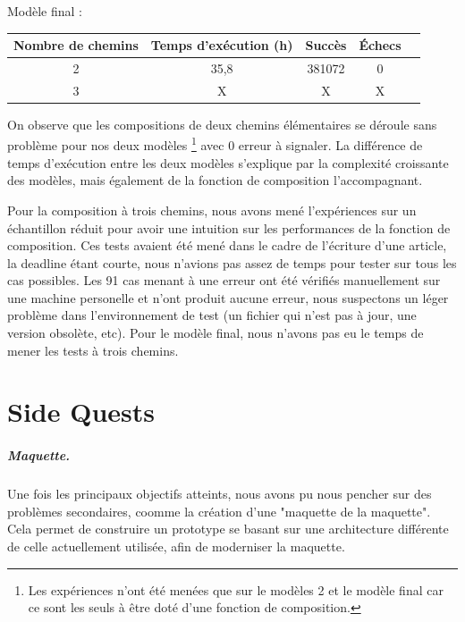 \documentclass[oneside, a4paper, 11pt]{book}
\begin{document}
\begin{center}
	Modèle final :
\begin{tabular}{|c|c|c|c|c|}
	\hline
	Nombre de chemins & Temps d'exécution (h) & Succès & Échecs\\
	\hline
	2 & 35,8 & 381072 & 0 \\
	\hline
	3 & X  & X & X \\
	\hline
\end{tabular}
\end{center}

On observe que les compositions de deux chemins élémentaires se déroule sans problème pour nos deux modèles \footnote{Les expériences n'ont été menées que sur le modèles 2 et le modèle final car ce sont les seuls à être doté d'une fonction de composition.} avec 0 erreur à signaler.
La différence de temps d'exécution entre les deux modèles s'explique par la complexité croissante des modèles, mais également de la fonction de composition l'accompagnant.

Pour la composition à trois chemins, nous avons mené l'expériences sur un échantillon réduit pour avoir une intuition sur les performances de la fonction de composition. Ces tests avaient été mené dans le cadre de l'écriture d'une article, la deadline étant courte, nous n'avions pas assez de temps pour tester sur tous les cas possibles.
Les 91 cas menant à une erreur ont été vérifiés manuellement sur une machine personelle et n'ont produit aucune erreur, nous suspectons un léger problème dans l'environnement de test (un fichier qui n'est pas à jour, une version obsolète, etc).  
Pour le modèle final, nous n'avons pas eu le temps de mener les tests à trois chemins.




\chapter{Side Quests}
\label{sec:sidequests}


\paragraph{Maquette.} Une fois les principaux objectifs atteints, nous avons pu nous pencher sur des problèmes secondaires, coomme la création d'une "maquette de la maquette".
Cela permet de construire un prototype se basant sur une architecture différente de celle actuellement utilisée, afin de moderniser la maquette.
\end{document}
